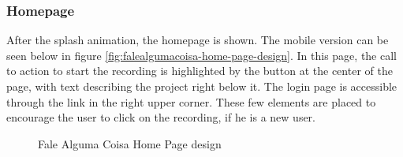 \subsubsection{Homepage}

After the splash animation, the homepage is shown. The mobile version can be seen below in figure \ref{fig:falealgumacoisa-home-page-design}. In this page, the call to action to start the recording is highlighted by the button at the center of the page, with text describing the project right below it. The login page is accessible through the link in the right upper corner. These few elements are placed to encourage the user to click on the recording, if he is a new user.

\begin{figure}[ht]
    \centering
    \caption{Fale Alguma Coisa Home Page design}

\end{figure}
